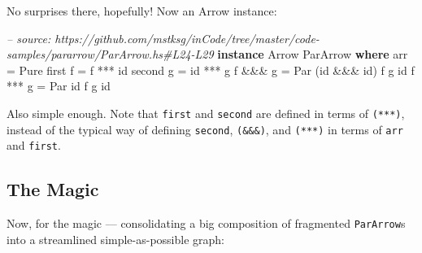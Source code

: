 \documentclass[]{article}
\newenvironment{Shaded}{\begin{snugshade}}{\end{snugshade}}
\newcommand{\CommentTok}[1]{\textcolor[rgb]{0.56,0.35,0.01}{\textit{#1}}}
\newcommand{\DataTypeTok}[1]{\textcolor[rgb]{0.13,0.29,0.53}{#1}}
\newcommand{\FunctionTok}[1]{\textcolor[rgb]{0.00,0.00,0.00}{#1}}
\newcommand{\KeywordTok}[1]{\textcolor[rgb]{0.13,0.29,0.53}{\textbf{#1}}}
\newcommand{\NormalTok}[1]{#1}
\begin{document}
No surprises there, hopefully! Now an Arrow instance:

\begin{Shaded}
\begin{Highlighting}[]
\CommentTok{-- source: https://github.com/mstksg/inCode/tree/master/code-samples/pararrow/ParArrow.hs#L24-L29}
\KeywordTok{instance} \DataTypeTok{Arrow} \DataTypeTok{ParArrow} \KeywordTok{where}
\NormalTok{    arr      }\FunctionTok{=} \DataTypeTok{Pure}
\NormalTok{    first f  }\FunctionTok{=}\NormalTok{ f  }\FunctionTok{***}\NormalTok{ id}
\NormalTok{    second g }\FunctionTok{=}\NormalTok{ id }\FunctionTok{***}\NormalTok{ g}
\NormalTok{    f }\FunctionTok{&&&}\NormalTok{ g  }\FunctionTok{=} \DataTypeTok{Par}\NormalTok{ (id }\FunctionTok{&&&}\NormalTok{ id) f g id}
\NormalTok{    f }\FunctionTok{***}\NormalTok{ g  }\FunctionTok{=} \DataTypeTok{Par}\NormalTok{ id          f g id}
\end{Highlighting}
\end{Shaded}

Also simple enough. Note that \texttt{first} and \texttt{second} are defined in
terms of \texttt{(***)}, instead of the typical way of defining \texttt{second},
\texttt{(\&\&\&)}, and \texttt{(***)} in terms of \texttt{arr} and
\texttt{first}.

\hypertarget{the-magic}{%
\subsection{The Magic}\label{the-magic}}

Now, for the magic --- consolidating a big composition of fragmented
\texttt{ParArrow}s into a streamlined simple-as-possible graph:
\end{document}
